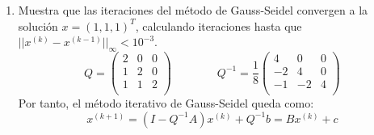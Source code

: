 \begin{ejercicio}
\begin{enumerate}
        \item Muestra que las iteraciones del método de Gauss-Seidel convergen a la solución $x=(1,1,1)^T$, calculando iteraciones hasta que $||x^{(k)}-x^{(k-1)}||_\infty < 10^{-3}$.
        $$Q=\left( \begin{array}{ccc}
            2 & 0 & 0 \\
            1 & 2 & 0 \\
            1 & 1 & 2 \\
        \end{array} \right)
        \qquad \qquad
        Q^{-1}=\frac{1}{8}\left( \begin{array}{ccc}
            4 & 0 & 0 \\
            -2 & 4 & 0 \\
            -1 & -2 & 4 \\
        \end{array} \right)
        $$
        Por tanto, el método iterativo de Gauss-Seidel queda como:
        $$x^{(k+1)} = (I-Q^{-1}A)x^{(k)} + Q^{-1}b 
        =Bx^{(k)} +c$$
        

\end{enumerate}
\end{ejercicio}
